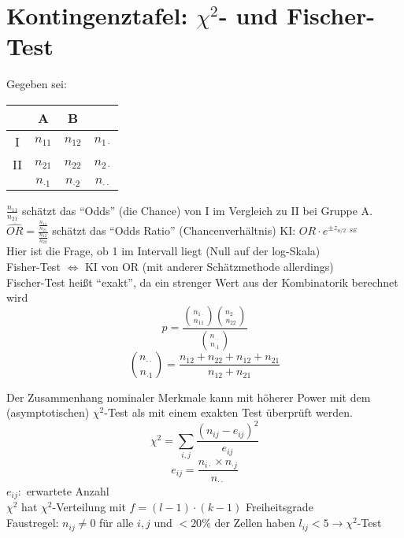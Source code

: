 \section{Kontingenztafel: $\chi^2$- und Fischer-Test}
Gegeben sei:
\begin{tabular}{c|c|c|c}
	& A & B \\ \hline
	I & $n_{11}$ & $n_{12}$ & $n_{1\cdot}$ \\ \hline
	II & $n_{21}$ & $n_{22}$ & $n_{2\cdot}$ \\ \hline
	& $n_{\cdot1}$ & $n_{\cdot2}$ & $n_{\cdot\cdot}$
\end{tabular}
\newline
$\frac{n_{11}}{n_{21}}$ schätzt das ``Odds'' (die Chance) von I im Vergleich zu II bei Gruppe A. \\
$\widehat{OR}=\frac{\frac{n_{11}}{n_{21}}}{\frac{n_{12}}{n_{22}}}$ schätzt das ``Odds Ratio'' (Chancenverhältnis) KI: $OR \cdot e^{\pm z_{a/2 \cdot SE}}$ \\
Hier ist die Frage, ob 1 im Intervall liegt (Null auf der log-Skala)\\
Fisher-Test $\Leftrightarrow$ KI von OR (mit anderer Schätzmethode allerdings)  \\
Fischer-Test heißt ``exakt'', da ein strenger Wert aus der Kombinatorik berechnet wird
\[ p = \frac{\binom{n_{1\cdot}}{n_{11}} \binom{n_{2\cdot}}{n_{22}}}{ \binom{n_{\cdot \cdot}}{n_{\cdot1}}} \]
\[ \binom{n_{\cdot\cdot}}{n_{\cdot1}} = \frac{n_{12} + n_{22} + n_{12} + n_{21} }{n_{12} + n_{21} } \]

Der Zusammenhang nominaler Merkmale kann mit höherer Power mit dem (asymptotischen) $\chi^2$-Test als mit einem exakten Test überprüft werden.
\[ \chi^2 = \sum\limits_{i,j} \frac{(n_{ij} - e_{ij})^2}{e_{ij}} \]
\[ e_{ij}= \frac{n_{i\cdot} \times n_{\cdot j}}{n_{\cdot \cdot}} \]
$e_{ij}:$ erwartete Anzahl \\
$\chi^2$ hat $\chi^2$-Verteilung mit $f=(l-1)\cdot(k-1)$ Freiheitsgrade \\
Faustregel: $n_{ij} \neq 0$ für alle $i,j$ und $< 20 \%$ der Zellen haben $l_{ij} < 5 \rightarrow \chi^2$-Test \\

